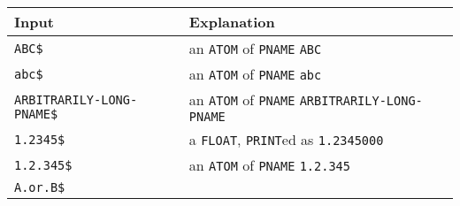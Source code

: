 \documentclass[a4paper,]{article}
\begin{document}
\begin{longtable}[]{@{}ll@{}}
\toprule
\begin{minipage}[b]{0.27\columnwidth}\raggedright\strut
Input\strut
\end{minipage} & \begin{minipage}[b]{0.67\columnwidth}\raggedright\strut
Explanation\strut
\end{minipage}\tabularnewline
\midrule
\endhead
\begin{minipage}[t]{0.27\columnwidth}\raggedright\strut
\texttt{ABC\$}\strut
\end{minipage} & \begin{minipage}[t]{0.67\columnwidth}\raggedright\strut
an \texttt{ATOM} of \texttt{PNAME} \texttt{ABC}\strut
\end{minipage}\tabularnewline
\begin{minipage}[t]{0.27\columnwidth}\raggedright\strut
\texttt{abc\$}\strut
\end{minipage} & \begin{minipage}[t]{0.67\columnwidth}\raggedright\strut
an \texttt{ATOM} of \texttt{PNAME} \texttt{abc}\strut
\end{minipage}\tabularnewline
\begin{minipage}[t]{0.27\columnwidth}\raggedright\strut
\texttt{ARBITRARILY-LONG-PNAME\$}\strut
\end{minipage} & \begin{minipage}[t]{0.67\columnwidth}\raggedright\strut
an \texttt{ATOM} of \texttt{PNAME} \texttt{ARBITRARILY-LONG-PNAME}\strut
\end{minipage}\tabularnewline
\begin{minipage}[t]{0.27\columnwidth}\raggedright\strut
\texttt{1.2345\$}\strut
\end{minipage} & \begin{minipage}[t]{0.67\columnwidth}\raggedright\strut
a \texttt{FLOAT}, \texttt{PRINT}ed as \texttt{1.2345000}\strut
\end{minipage}\tabularnewline
\begin{minipage}[t]{0.27\columnwidth}\raggedright\strut
\texttt{1.2.345\$}\strut
\end{minipage} & \begin{minipage}[t]{0.67\columnwidth}\raggedright\strut
an \texttt{ATOM} of \texttt{PNAME} \texttt{1.2.345}\strut
\end{minipage}\tabularnewline
\begin{minipage}[t]{0.27\columnwidth}\raggedright\strut
\texttt{A.or.B\$}\strut
\end{minipage} & \begin{minipage}[t]{0.67\columnwidth}\raggedright\strut

\end{minipage}
\end{longtable}
\end{document}
